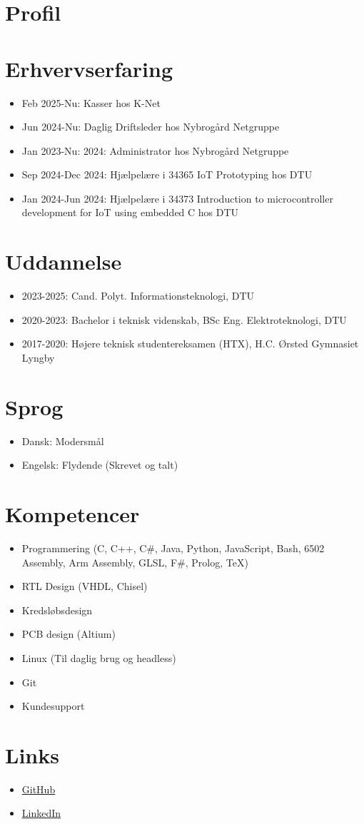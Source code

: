 \section{Profil}


\section{Erhvervserfaring}
	\begin{itemize}
		\item Feb 2025-Nu: Kasser hos K-Net
		\item Jun 2024-Nu: Daglig Driftsleder hos Nybrogård Netgruppe
		\item Jan 2023-Nu: 2024: Administrator hos Nybrogård Netgruppe
		\item Sep 2024-Dec 2024: Hjælpelære i 34365 IoT Prototyping hos DTU
		\item Jan 2024-Jun 2024: Hjælpelære i 34373 Introduction to microcontroller development for IoT using embedded C hos DTU
	\end{itemize}

\section{Uddannelse}
	\begin{itemize}
		\item 2023-2025: Cand. Polyt. Informationsteknologi, DTU
		\item 2020-2023: Bachelor i teknisk videnskab, BSc Eng. Elektroteknologi, DTU
		\item 2017-2020: Højere teknisk studentereksamen (HTX), H.C. Ørsted Gymnasiet Lyngby
	\end{itemize}

\section{Sprog}
	\begin{itemize}
		\item Dansk: Modersmål
		\item Engelsk: Flydende (Skrevet og talt)
	\end{itemize}

\section{Kompetencer}
	\begin{itemize}
		\item Programmering (C, C++, C\#, Java, Python, JavaScript, Bash, 6502 Assembly, Arm Assembly, GLSL, F\#, Prolog, TeX)
		\item RTL Design (VHDL, Chisel)
		\item Kredsløbsdesign
		\item PCB design (Altium)
		\item Linux (Til daglig brug og headless)
		\item Git
		\item Kundesupport
	\end{itemize}

\section{Links}
	\begin{itemize}
		\item \href{https://github.com/jondalnas}{GitHub}
		\item \href{https://www.linkedin.com/in/jonas-jensen-68a1091b1/}{LinkedIn}
	\end{itemize}
